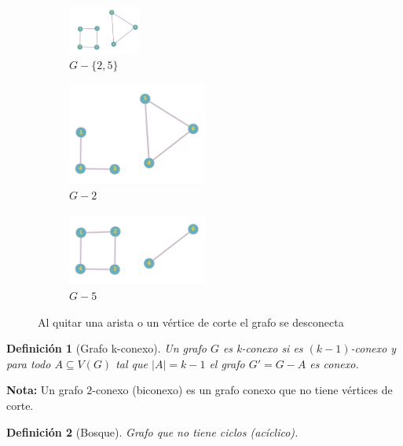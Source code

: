 \documentclass[a4paper,1pt]{report}
\newtheorem*{dfn}{Definición}
\begin{document}
\begin{figure}[H]
    \centering
    \begin{subfigure}[b]{0.45\textwidth}
    \centering
    \includegraphics[width=0.26\textwidth]{figures2/G-E.png}
    \caption{$G - \{2,5\}$}
    \end{subfigure}
    \begin{subfigure}[b]{0.22\textwidth}
        \centering
    \includegraphics[width=0.5\textwidth]{figures2/G-2.png}
    \caption{$G - 2$}
    \end{subfigure}
    \begin{subfigure}[b]{0.22\textwidth}
    \centering
    \includegraphics[width=0.5\textwidth]{figures2/G-5.png}
    \caption{$G - 5$}
    \end{subfigure}
    \caption{Al quitar una arista o un v\'ertice de corte el grafo se desconecta}
\end{figure} 

\begin{dfn}[Grafo k-conexo]
    Un grafo $G$ es k-conexo si es $(k-1)$-conexo y para todo $A \subseteq V(G)$ tal que $|A| =k-1$ el grafo $G'= G -A$ es conexo.
\end{dfn}

\textbf{Nota:} Un grafo $2$-conexo (biconexo) es un grafo conexo que no tiene v\'ertices de corte.

\begin{dfn}[Bosque]
    Grafo que no tiene ciclos (ac\'iclico).
\end{dfn}
\end{document}
